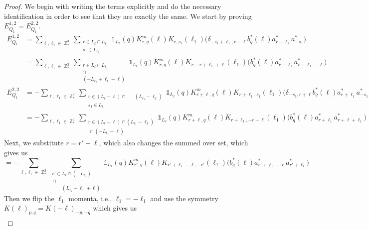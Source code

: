 \documentclass[sn-mathphys, Numbered ,a4paper]{sn-jnl}%
\DeclareMathOperator{\Z}{\mathbb{Z}}
\theoremstyle{plain}
\theoremstyle{definition}
\theoremstyle{remark}
\theoremstyle{plain}
\theoremstyle{definition}
\theoremstyle{remark}
\begin{document}
\begin{proof}
	We begin with writing the terms explicitly and do the necessary identification in order to see that they are exactly the same.
	We start by proving $E_{Q_1}^{1,2}=E_{Q_1}^{2,2}$.
	\begin{align}
		E_{Q_1}^{1,2} &={\sum\limits_{\ell, \ell_1\in \Z^3_*}\sum\limits_{\substack{r \in L_{\ell}\cap  L_{\ell_1}\\s_1\in L_{\ell_1}}} \!\!\! \mathds{1}_{L_\ell}(q) K^{m}_{r,q}(\ell) K_{r,s_1}(\ell_1)\Big( 
		\delta_{-s_1+\ell_1,r-\ell} b^*_{q}(\ell) a^*_{r-\ell_1} a^*_{-s_1} \Big)\nonumber}\\
		&=\sum\limits_{\ell, \ell_1\in \Z^3_*}\sum\limits_{\substack{r \in L_{\ell}\cap  L_{\ell_1}\\ \cap \\(-L_{\ell_1}+\ell_1+\ell)}} \!\!\! \mathds{1}_{L_\ell}(q) K^{m}_{r,q}(\ell) K_{r,-r+\ell_1+\ell}(\ell_1)\Big( b^*_{q}(\ell) a^*_{r-\ell_1} a^*_{r-\ell_1-\ell} \Big)\label{eq:EQ112}\\
		E_{Q_1}^{2,2} &= -\sum\limits_{\ell, \ell_1\in \Z^3_*}\sum\limits_{\substack{r \in  (L_{\ell}-\ell)  \cap \phantom{r\in}  (L_{\ell_1}-\ell_1) \\ s_1 \in L_{\ell_1}}} \!\!\!\! \mathds{1}_{L_\ell}(q) K^{m}_{r+\ell,q}(\ell)
		K_{r+\ell_1,s_1}(\ell_1)\Big(\delta_{-s_1,r+\ell} b^*_{q}(\ell) a^*_{r+\ell_1}a^*_{-s_1+\ell_1}\Big) \nonumber\\
		 &=-\sum\limits_{\ell, \ell_1\in \Z^3_*}\sum\limits_{\substack{r \in  (L_{\ell}-\ell) \cap (L_{\ell_1}-\ell_1) \\ \, \cap   (-L_{\ell_1}-\ell)}} \!\!\!\! \mathds{1}_{L_\ell}(q) K^{m}_{r+\ell,q}(\ell)
		K_{r+\ell_1,-r-\ell}(\ell_1)\Big( b^*_{q}(\ell) a^*_{r+\ell_1}a^*_{r+\ell+\ell_1}\Big)  
	\end{align}
Next, we substitute $r = r'-\ell $, which also changes the summed over set, which gives us
	\begin{equation}
		=-\sum\limits_{\ell, \ell_1\in \Z^3_*}\sum\limits_{\substack{r' \in  L_{\ell} \cap (-L_{\ell_1}) \\ \, \cap\\ \phantom{r'\in}  (L_{\ell_1}-\ell_1+\ell)}} \!\!\!\! \mathds{1}_{L_\ell}(q) K^{m}_{r',q}(\ell)
		K_{r'+\ell_1-\ell,-r'}(\ell_1)\Big( b^*_{q}(\ell) a^*_{r'+\ell_1-\ell}a^*_{r'+\ell_1}\Big) 
	\end{equation}
Then we flip the $\ell_1$ momenta, i.e., $\ell_1 = -\ell_1$ and use the symmetry $K(\ell)_{p,q} = K(-\ell)_{-p,-q}$ which gives us
	\begin{align}

\end{align}
\end{proof}
\end{document}
